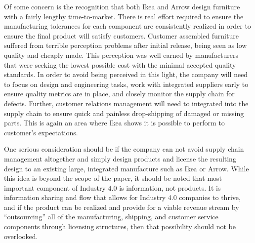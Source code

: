 \documentclass[man]{apa7}
\begin{document}
Of some concern is the recognition that both Ikea and Arrow design furniture with a fairly lengthy time-to-market. There is real effort required to ensure the manufacturing tolerances for each component are consistently realized in order to ensure the final product will satisfy customers. Customer assembled furniture suffered from terrible perception problems after initial release, being seen as low quality and cheaply made. This perception was well earned by manufacturers that were seeking the lowest possible cost with the minimal accepted quality standards. In order to avoid being perceived in this light, the company will need to focus on design and engineering tasks, work with integrated suppliers early to ensure quality metrics are in place, and closely monitor the supply chain for defects. Further, customer relations management will need to integrated into the supply chain to ensure quick and painless drop-shipping of damaged or missing parts. This is again an area where Ikea shows it is possible to perform to customer's expectations.

One serious consideration should be if the company can not avoid supply chain management altogether and simply design products and license the resulting design to an existing large, integrated manufacture such as Ikea or Arrow.  While this idea is beyond the scope of the paper, it should be noted that most important component of Industry 4.0 is information, not products. It is information sharing and flow that allows for Industry 4.0 companies to thrive, and if the product can be realized and provide for a viable revenue stream by ``outsourcing'' all of the manufacturing, shipping, and customer service components through licensing structures, then that possibility should not be overlooked.

\printbibliography
\end{document}
